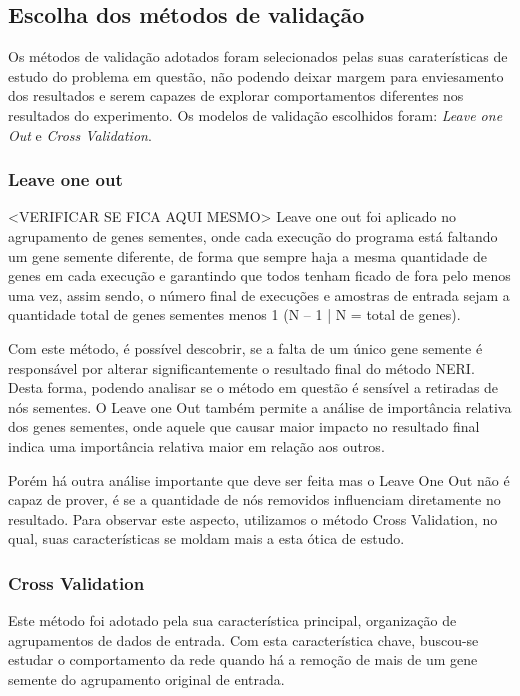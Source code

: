 \subsection{Escolha dos métodos de validação}
Os métodos de validação adotados foram selecionados pelas suas caraterísticas de estudo do problema em questão, não podendo deixar margem para enviesamento dos resultados e serem capazes de explorar comportamentos diferentes nos resultados do experimento. Os modelos de validação escolhidos foram: \textit{Leave one Out} e \textit{Cross Validation}.


\subsubsection{Leave one out}
<VERIFICAR SE FICA  AQUI MESMO>
Leave one out foi aplicado no agrupamento de genes sementes, onde cada execução do programa está faltando um gene semente diferente, de forma que sempre haja a mesma quantidade de genes em cada execução e garantindo que todos tenham ficado de fora pelo menos uma vez, assim sendo, o número final de execuções e amostras de entrada sejam a quantidade total de genes sementes menos 1 (N – 1 | N = total de genes).

Com este método, é possível descobrir, se a falta de um único gene semente é responsável por alterar significantemente o resultado final do método NERI. Desta forma, podendo analisar se o método em questão é sensível a retiradas de nós sementes. 
O Leave one Out também permite a análise de importância relativa dos genes sementes, onde aquele que causar maior impacto no resultado final indica uma importância relativa maior em relação aos outros. 


Porém há outra análise importante que deve ser feita mas o Leave One Out não é capaz de prover, é se a quantidade de nós removidos influenciam diretamente no resultado. Para observar este aspecto, utilizamos o método Cross Validation, no qual, suas características se moldam mais a esta ótica de estudo.


\subsubsection{Cross Validation}

Este método foi adotado pela sua característica principal, organização de agrupamentos de dados de entrada. Com esta característica chave, buscou-se estudar o comportamento da rede quando há a remoção de mais de um gene semente do agrupamento original de entrada.

